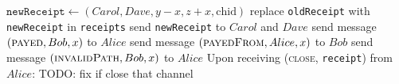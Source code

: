 \begin{algorithm}
\begin{algorithmic}[1]
          \State $\mathtt{newReceipt} \gets \left(Carol, Dave, y - x, z + x,
          \mathrm{chid}\right)$
          \State replace \texttt{oldReceipt} with \texttt{newReceipt} in
          \texttt{receipts}
          \State send \texttt{newReceipt} to $Carol$ and $Dave$
        \EndFor
        \State send message $\left(\textsc{payed}, Bob, x\right)$ to $Alice$
        \State send message $\left(\textsc{payedFrom}, Alice, x\right)$ to $Bob$
      \Else
        \State send message $\left(\textsc{invalidPath}, Bob, x\right)$ to $Alice$
      \EndIf
    \EndIndent
    \State
    \State Upon receiving (\textsc{close}, \texttt{receipt}) from $Alice$:
    \Indent
        \State TODO: fix if
        \State close that channel
      \EndIf
    \EndIndent
  \end{algorithmic}
\end{algorithm}
